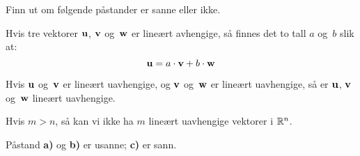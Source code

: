 \begin{oppgave}
Finn ut om følgende påstander er sanne eller ikke.
\begin{punkt}
Hvis tre vektorer $\mathbf{u}$, $\mathbf{v}$ og~$\mathbf{w}$ er lineært
avhengige, så finnes det to tall $a$ og~$b$ slik at: 
\[
\mathbf{u} = a \cdot \mathbf{v} + b \cdot \mathbf{w}
\]
\end{punkt}

\begin{punkt}
Hvis $\mathbf{u}$ og~$\mathbf{v}$ er lineært uavhengige,
og $\mathbf{v}$ og~$\mathbf{w}$ er lineært uavhengige,
så er $\mathbf{u}$, $\mathbf{v}$ og~$\mathbf{w}$ lineært uavhengige.
\end{punkt}

\begin{punkt}
Hvis $m>n$, så kan vi ikke ha $m$ lineært uavhengige vektorer i $\mathbb{R}^n$.
\end{punkt}

\end{oppgave}

\begin{losning}
Påstand \textbf{a)} og \textbf{b)} er usanne; \textbf{c)} er sann.
\end{losning}










